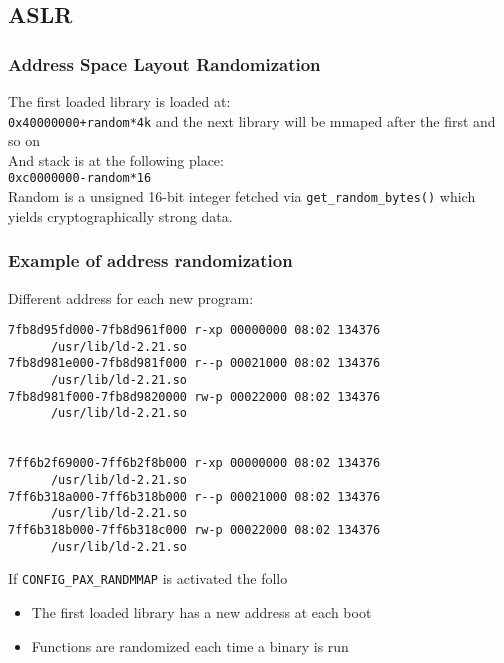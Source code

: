 \documentclass[10pt]{beamer}
\begin{document}
\subsection{ASLR}
\begin{frame}
\frametitle{Address Space Layout Randomization}
The first loaded library is loaded at:\\
\vspace{1mm}
\hspace{10mm}\texttt{0x40000000+random*4k}
\vspace{1mm}
and the next library will be mmaped after the first and so on\\
\vspace{3mm}
And stack is at the following place:\\
\vspace{1mm}
\hspace{10mm}\texttt{0xc0000000-random*16}\\
\vspace{3mm}
Random is a unsigned 16-bit integer fetched via \texttt{get\_random\_bytes()} which
yields cryptographically strong data.
\end{frame}

\begin{frame}[fragile]
\frametitle{Example of address randomization}
Different address for each new program:
\begin{lstlisting}
7fb8d95fd000-7fb8d961f000 r-xp 00000000 08:02 134376
      /usr/lib/ld-2.21.so
7fb8d981e000-7fb8d981f000 r--p 00021000 08:02 134376
      /usr/lib/ld-2.21.so
7fb8d981f000-7fb8d9820000 rw-p 00022000 08:02 134376
      /usr/lib/ld-2.21.so


7ff6b2f69000-7ff6b2f8b000 r-xp 00000000 08:02 134376
      /usr/lib/ld-2.21.so
7ff6b318a000-7ff6b318b000 r--p 00021000 08:02 134376
      /usr/lib/ld-2.21.so
7ff6b318b000-7ff6b318c000 rw-p 00022000 08:02 134376
      /usr/lib/ld-2.21.so
\end{lstlisting}
\end{frame}

\begin{frame}
If \texttt{CONFIG\_PAX\_RANDMMAP} is activated the follo
\begin{itemize}
\item The first loaded library has a new address at each boot
\item Functions are randomized each time a binary is run
\end{itemize}
\end{frame}
\end{document}
